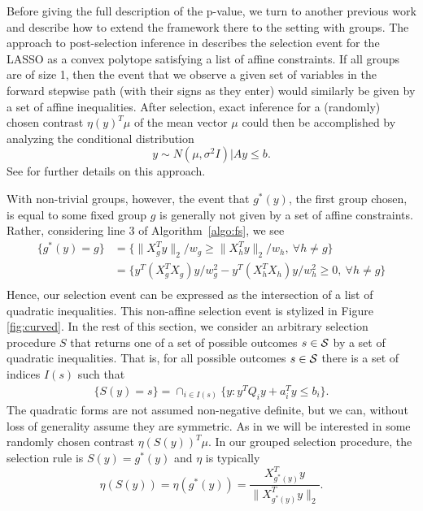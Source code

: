 \documentclass{imsart}
\begin{document}
Before giving the full description of the p-value, we turn to another
previous work and describe how to extend the framework there to the
setting with groups.
The approach to post-selection inference in \cite{LASSO:fixed}
describes the selection event for the LASSO as a convex polytope
satisfying a list of affine constraints.
If all groups are of size 1, then
the event that we observe a given set of variables
in the forward stepwise path (with their signs as they enter) would similarly
be given by a set of affine inequalities.
After selection, exact inference for a (randomly) chosen contrast $\eta(y)^T\mu$ of the mean vector
$\mu$ could then be accomplished by analyzing the conditional distribution
\begin{equation}
y \sim N(\mu, \sigma^2 I) \bigl| Ay \leq b.
\end{equation}
See \cite{LASSO:fixed,exact:lars} for further details on this approach.

With non-trivial groups, however, the event that $g^*(y)$, the first
group chosen, is equal to some fixed group $g$ is generally not given by
a set of affine constraints. Rather, considering line 3 of Algorithm~\ref{algo:fs}, we see
\begin{equation}
\label{eq:first:quadratic}
\begin{aligned}
\{g^*(y)=g\} &= \{ \|X_g^Ty\|_2 /w_g \geq \|X_h^Ty\|_2 /w_h , \ \forall h \neq g\} \\
&=  \{ y^T(X_g^TX_g)y / w_g^2 - y^T(X_h^TX_h)y / w_h^2 \geq 0, \ \forall h \neq g\} \\
\end{aligned}
\end{equation}
Hence, our selection event can be expressed as 
the intersection of a list of quadratic inequalities. This non-affine selection event is stylized in Figure
\ref{fig:curved}.
In the rest of this section, we consider an arbitrary selection procedure
$S$ that returns one of a set of possible outcomes $s \in {\cal S}$ by a set of quadratic inequalities.
That is, for all possible outcomes $s \in {\cal S}$ there is a set of indices
$I(s)$ such that
\begin{equation}
\label{eq:selection}
\begin{aligned}
\{S(y)=s\} = \cap_{i \in I(s)} \{y: y^TQ_iy + a_i^Ty\leq b_i \}.
\end{aligned}
\end{equation}
The quadratic forms are not assumed non-negative definite, but we can, without loss of generality
assume they are symmetric.
As in \cite{LASSO:fixed} we will be interested in some randomly chosen contrast
$\eta(S(y))^T\mu$.
In our grouped selection procedure, the selection rule is $S(y)=g^*(y)$
and $\eta$ is typically 
$$
\eta(S(y)) = \eta(g^*(y)) = \frac{X_{g^*(y)}^Ty}{\|X_{g^*(y)}^Ty\|_2}.
$$
\end{document}
